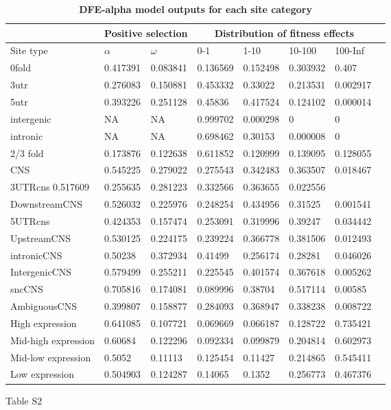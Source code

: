 \begin{table}[ht!]
\centering
\begin{tabular}{|l |l l |l l l l l|} 
\hline
 &\multicolumn{2}{|c|}{Positive selection} & \multicolumn{4}{|c|}{Distribution of fitness effects} \\ [0.5ex]
\hline
Site type & $\alpha$& 	$\omega$& 		0-1& 	1-10& 	10-100& 	100-Inf \\ [0.5ex]
 \hline
0fold& 	0.417391& 	0.083841& 	0.136569& 	0.152498& 	0.303932& 	0.407\\
3utr& 	0.276083& 	0.150881& 		0.453332& 	0.33022& 	0.213531& 	0.002917\\
5utr& 	0.393226& 	0.251128& 		0.45836& 	0.417524& 	0.124102& 	0.000014\\
intergenic& 	NA& 	NA& 		0.999702& 	0.000298& 	0& 	0\\
intronic& 	NA& 	NA& 		0.698462& 	0.30153& 	0.000008& 	0\\
2/3 fold& 	0.173876& 	0.122638& 		0.611852& 	0.120999& 	0.139095& 	0.128055\\
CNS& 	0.545225& 	0.279022& 		0.275543& 	0.342483& 	0.363507& 	0.018467\\
\hline							
3UTRcns	0.517609& 	0.255635& 		0.281223& 	0.332566& 	0.363655& 	0.022556\\
DownstreamCNS& 	0.526032& 	0.225976& 		0.248254& 	0.434956& 	0.31525& 	0.001541\\
5UTRcns& 	0.424353& 	0.157474& 		0.253091& 	0.319996& 	0.39247& 	0.034442\\
UpstreamCNS& 	0.530125& 	0.224175& 		0.239224& 	0.366778& 	0.381506& 	0.012493\\
intronicCNS& 	0.50238& 	0.372934& 		0.41499& 	0.256174& 	0.28281& 	0.046026\\
IntergenicCNS& 	0.579499& 	0.255211& 		0.225545& 	0.401574& 	0.367618& 	0.005262\\
sncCNS& 	0.705816& 	0.174081& 		0.089996& 	0.38704& 	0.517114& 	0.00585\\
AmbiguousCNS& 	0.399807& 	0.158877& 		0.284093& 	0.368947& 	0.338238& 	0.008722\\
\hline							
High expression& 	0.641085& 	0.107721& 		0.069669& 	0.066187& 	0.128722& 	0.735421\\
Mid-high expression& 	0.60684& 	0.122296& 		0.092334& 	0.099879& 	0.204814& 	0.602973\\
Mid-low expression& 	0.5052& 	0.11113& 		0.125454& 	0.11427& 	0.214865& 	0.545411\\
Low expression& 	0.504903& 	0.124287& 		0.14065& 	0.1352& 	0.256773& 	0.467376\\ [0.5ex] 
 \hline
\end{tabular}
\caption{\textbf{DFE-alpha model outputs for each site category}}
\label{table:s2}
\end{table}

Table S2



